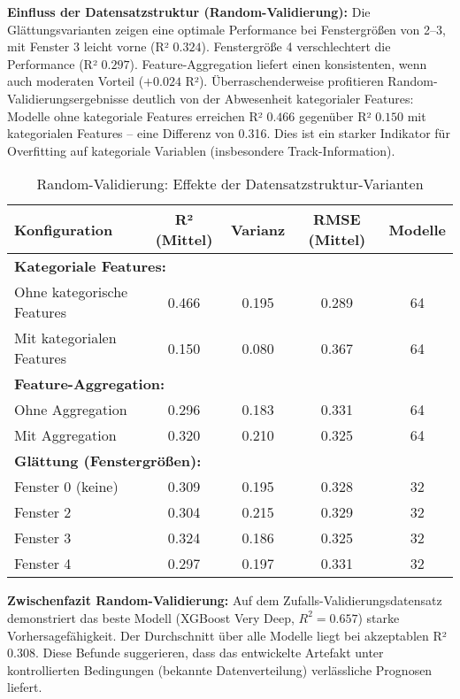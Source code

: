 \textbf{Einfluss der Datensatzstruktur (Random-Validierung):}
Die Glättungsvarianten zeigen eine optimale Performance bei Fenstergrößen von 2–3, mit Fenster 3 leicht vorne (R² $0.324$). Fenstergröße 4 verschlechtert die Performance (R² $0.297$). Feature-Aggregation liefert einen konsistenten, wenn auch moderaten Vorteil ($+0.024$ R²). Überraschenderweise profitieren Random-Validierungsergebnisse deutlich von der Abwesenheit kategorialer Features: Modelle ohne kategoriale Features erreichen R² $0.466$ gegenüber R² $0.150$ mit kategorialen Features – eine Differenz von 0.316. Dies ist ein starker Indikator für Overfitting auf kategoriale Variablen (insbesondere Track-Information).

\begin{table}[H]
  \centering
  \begin{tabular}{lcccc}
    \toprule
    \textbf{Konfiguration} & \textbf{R² (Mittel)} & \textbf{Varianz} & \textbf{RMSE (Mittel)} & \textbf{Modelle} \\
    \midrule
    \multicolumn{5}{l}{\textbf{Kategoriale Features:}} \\
    Ohne kategorische Features & 0.466 & 0.195 & 0.289 & 64 \\
    Mit kategorialen Features & 0.150 & 0.080 & 0.367 & 64 \\
    \midrule
    \multicolumn{5}{l}{\textbf{Feature-Aggregation:}} \\
    Ohne Aggregation & 0.296 & 0.183 & 0.331 & 64 \\
    Mit Aggregation & 0.320 & 0.210 & 0.325 & 64 \\
    \midrule
    \multicolumn{5}{l}{\textbf{Glättung (Fenstergrößen):}} \\
    Fenster 0 (keine) & 0.309 & 0.195 & 0.328 & 32 \\
    Fenster 2 & 0.304 & 0.215 & 0.329 & 32 \\
    Fenster 3 & 0.324 & 0.186 & 0.325 & 32 \\
    Fenster 4 & 0.297 & 0.197 & 0.331 & 32 \\
    \bottomrule
  \end{tabular}
  \caption{Random-Validierung: Effekte der Datensatzstruktur-Varianten}
  \label{tab:structure_random}
\end{table}

\textbf{Zwischenfazit Random-Validierung:} Auf dem Zufalls-Validierungsdatensatz demonstriert das beste Modell (XGBoost Very Deep, $R^2 = 0.657$) starke Vorhersagefähigkeit. Der Durchschnitt über alle Modelle liegt bei akzeptablen R² $0.308$. Diese Befunde suggerieren, dass das entwickelte Artefakt unter kontrollierten Bedingungen (bekannte Datenverteilung) verlässliche Prognosen liefert.

